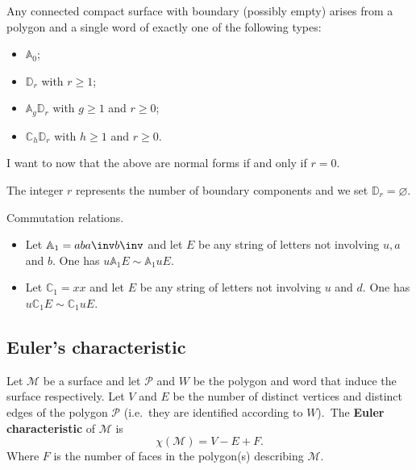 \documentclass[12pt, a4paper]{article}
\begin{document}
\begin{mdthm}
    Any connected compact surface with boundary (possibly empty) arises from a polygon and a single word of exactly one of the following types:
    \begin{itemize}
        \item \(\mathbb{A}_0\);
        \item \(\mathbb{D}_r\) with \(r\geq 1\);
        \item \(\mathbb{A}_g\mathbb{D}_r\) with \(g\geq 1\) and \(r\geq 0\);
        \item \(\mathbb{C}_h\mathbb{D}_r\) with \(h\geq 1\) and \(r\geq 0\).
    \end{itemize}
\end{mdthm}

\begin{mdremark}
    I want to now that the above are normal forms if and only if \(r=0\).
\end{mdremark}

\begin{mdremark}
    The integer \(r\) represents the number of boundary components and we set \(\mathbb{D}_r=\varnothing\).
\end{mdremark}

\begin{mdlemma}
    Commutation relations.
    \begin{itemize}
        \item Let \(\mathbb{A}_1=aba\inv b\inv\) and let \(E\) be any string of letters not involving \(u,a\) and \(b\). One has \(u\mathbb{A}_1 E \sim\mathbb{A}_1uE\).
        \item Let \(\mathbb{C}_1=xx\) and let \(E\) be any string of letters not involving \(u\) and \(d\). One has \(u\mathbb{C}_1 E \sim \mathbb{C}_1 uE\).
    \end{itemize}
\end{mdlemma}

\subsection{Euler's characteristic}

\begin{definition}
    Let \(\mathcal{M}\) be a surface and let \(\mathcal{P}\) and \(W\) be the polygon and word that induce the surface respectively. Let \(V\) and \(E\) be the number of distinct vertices and distinct edges of the polygon \(\mathcal{P}\) (i.e.\ they are identified according to \(W\)).\ The \textbf{Euler characteristic} of \(\mathcal{M}\) is 
    \[\chi(\mathcal{M})=V-E+F.\]
    Where \(F\) is the number of faces in the polygon(s) describing \(\mathcal{M}\). 
\end{definition}
\end{document}
